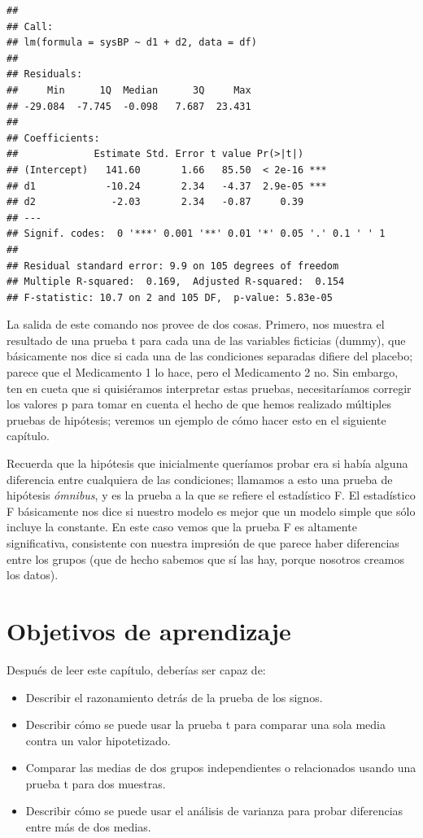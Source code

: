 \documentclass[
  12pt,
]{book}
\providecommand{\tightlist}{%
  \setlength{\itemsep}{0pt}\setlength{\parskip}{0pt}}
\begin{document}
\begin{verbatim}
## 
## Call:
## lm(formula = sysBP ~ d1 + d2, data = df)
## 
## Residuals:
##     Min      1Q  Median      3Q     Max 
## -29.084  -7.745  -0.098   7.687  23.431 
## 
## Coefficients:
##             Estimate Std. Error t value Pr(>|t|)    
## (Intercept)   141.60       1.66   85.50  < 2e-16 ***
## d1            -10.24       2.34   -4.37  2.9e-05 ***
## d2             -2.03       2.34   -0.87     0.39    
## ---
## Signif. codes:  0 '***' 0.001 '**' 0.01 '*' 0.05 '.' 0.1 ' ' 1
## 
## Residual standard error: 9.9 on 105 degrees of freedom
## Multiple R-squared:  0.169,  Adjusted R-squared:  0.154 
## F-statistic: 10.7 on 2 and 105 DF,  p-value: 5.83e-05
\end{verbatim}

La salida de este comando nos provee de dos cosas. Primero, nos muestra el resultado de una prueba t para cada una de las variables ficticias (dummy), que básicamente nos dice si cada una de las condiciones separadas difiere del placebo; parece que el Medicamento 1 lo hace, pero el Medicamento 2 no. Sin embargo, ten en cueta que si quisiéramos interpretar estas pruebas, necesitaríamos corregir los valores p para tomar en cuenta el hecho de que hemos realizado múltiples pruebas de hipótesis; veremos un ejemplo de cómo hacer esto en el siguiente capítulo.

Recuerda que la hipótesis que inicialmente queríamos probar era si había alguna diferencia entre cualquiera de las condiciones; llamamos a esto una prueba de hipótesis \emph{ómnibus}, y es la prueba a la que se refiere el estadístico F. El estadístico F básicamente nos dice si nuestro modelo es mejor que un modelo simple que sólo incluye la constante. En este caso vemos que la prueba F es altamente significativa, consistente con nuestra impresión de que parece haber diferencias entre los grupos (que de hecho sabemos que sí las hay, porque nosotros creamos los datos).

\hypertarget{objetivos-de-aprendizaje-14}{%
\section{Objetivos de aprendizaje}\label{objetivos-de-aprendizaje-14}}

Después de leer este capítulo, deberías ser capaz de:

\begin{itemize}
\tightlist
\item
  Describir el razonamiento detrás de la prueba de los signos.
\item
  Describir cómo se puede usar la prueba t para comparar una sola media contra un valor hipotetizado.
\item
  Comparar las medias de dos grupos independientes o relacionados usando una prueba t para dos muestras.
\item
  Describir cómo se puede usar el análisis de varianza para probar diferencias entre más de dos medias.
\end{itemize}
\end{document}
